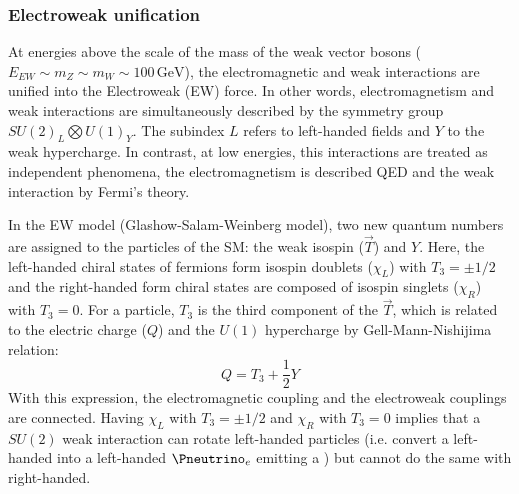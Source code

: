 



 


\subsubsection{Electroweak unification}
At energies above the scale of the mass of the weak vector bosons ($E_{EW} \sim m_{Z} \sim m_{W} \sim 100\,\textrm{GeV} $), the electromagnetic 
and weak interactions are unified into the Electroweak (EW) force. In other words, electromagnetism and weak interactions are simultaneously described by the symmetry group $SU(2)_{L} \bigotimes U(1)_{Y}$. 
The subindex $L$ refers to left-handed fields and $Y$ to the weak hypercharge.  In contrast, at low energies, this interactions are treated as independent phenomena, 
the electromagnetism is described QED and the weak interaction by Fermi's theory.

In the EW model (Glashow-Salam-Weinberg model), two new quantum numbers  are assigned to the particles of the SM: the weak isospin ($\overrightarrow{T}$) and $Y$.
Here, the left-handed chiral states of fermions form isospin doublets ($\chi_{L}$) with $T_{3} = \pm 1/2$ and the right-handed form chiral states are composed of isospin singlets ($\chi_R$)  with $T_{3} = 0$.
For a particle, $T_{3}$ is the third component of the $\overrightarrow{T}$, which is related to the electric charge ($Q$) and the $U(1)$ hypercharge by Gell-Mann-Nishijima relation:
\begin{equation}\label{eq:chap1:EW:GMN}
	Q = T_{3} + \frac{1}{2} Y
\end{equation}
With this expression, the electromagnetic coupling and the electroweak couplings are connected.
Having $\chi_L$ with $T_{3} = \pm 1/2$ and $\chi_{R}$  with $T_{3} = 0$ implies that a $SU(2)$ weak interaction can rotate left-handed particles 
(i.e. convert a left-handed \Pelectron into a left-handed $\Pneutrino_{e}$ emitting a \PWminus) but cannot do the same with right-handed.


